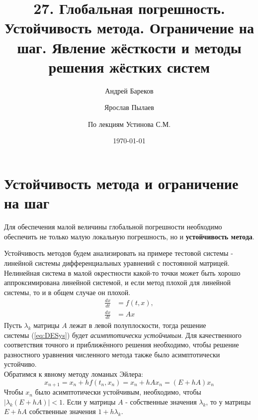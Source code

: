 \documentclass[a4paper,11pt]{article}
\title{27. Глобальная погрешность. Устойчивость метода. Ограничение на шаг. Явление жёсткости и методы решения жёстких систем}
\author{Андрей Бареков \and Ярослав Пылаев \and По лекциям Устинова С.М.}
\date{\today}
\begin{document}
\maketitle
\newpage

\section{Устойчивость метода и ограничение на шаг}
\begin{importantblock}
  Для обеспечения малой величины глобальной погрешности необходимо обеспечить не только малую локальную погрешность, но и \textbf{устойчивость метода}.
\end{importantblock}

\noindent Устойчивость методов будем анализировать на примере тестовой системы - линейной системы дифференциальных уравнений с постоянной матрицей. Нелинейная система
  в малой окрестности какой-то точки может быть хорошо аппроксимирована линейной системой, и если метод плохой для линейной системы, то и в общем случае он плохой. \\
\marginpar {
  \footnotesize \[x_{n+1} = Bx_n\] \[|\lambda_k(B)| < 1\] \[\Re(\lambda_k) < 0\]
}
\begin{align}
  \frac{dx}{dt} &= f(t, x), \\
  \frac{dx}{dt} &= Ax
  \label{eq:DESys}
\end{align}
Пусть $\lambda_k$ матрицы $A$ лежат в левой полуплоскости, тогда решение \\ системы (\ref{eq:DESys}) будет \textit{асимптотически устойчивым}.
Для качественного соответствия точного и приближённого решения необходимо, чтобы решение разностного уравнения численного метода также было асимптотически устойчиво. \\

\noindent Обратимся к явному методу ломаных Эйлера:
\begin{equation}
  x_{n+1} = x_n + hf(t_n, x_n) = x_n + hAx_n = (E + hA)x_n
  \label{eq:FEM}
\end{equation}
Чтобы $x_n$ было асимптотически устойчивым, необходимо, чтобы \\ $|\lambda_k(E + hA)| < 1$.
Если у матрицы $A$ - собственные значения $\lambda_k$, то у матрицы $E + hA$ собственные значения $1 + h\lambda_k$. \\
\end{document}
